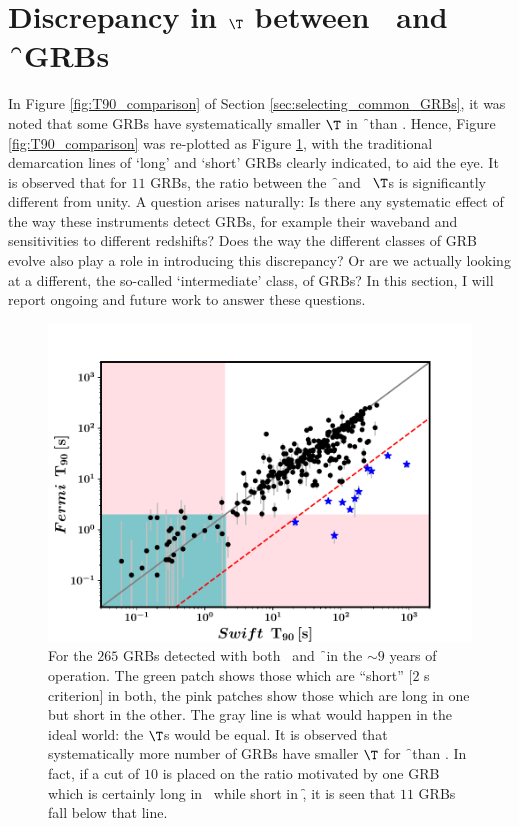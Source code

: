 \section*{\texorpdfstring{Discrepancy in $\T$ between \s\ and \f\ GRBs}{}}
In Figure \ref{fig:T90_comparison} of Section \ref{sec:selecting_common_GRBs}, it was noted that some GRBs have systematically smaller $\T$ in \f\ than \s. Hence, Figure \ref{fig:T90_comparison} was re-plotted as Figure \ref{fig:T90_vs_T90}, with the traditional demarcation lines of `long' and `short' GRBs clearly indicated, to aid the eye. It is observed that for $11$ GRBs, the ratio between the \f\ and \s\ $\T$s is significantly different from unity. A question arises naturally: Is there any systematic effect of the way these instruments detect GRBs, for example their waveband and sensitivities to different redshifts? Does the way the different classes of GRB evolve also play a role in introducing this discrepancy? Or are we actually looking at a different, the so-called `intermediate' class, of GRBs? In this section, I will report ongoing and future work to answer these questions.

\begin{figure}
\begin{center}
\includegraphics[scale=0.5]{T90_vs_T90--all}
\caption[Detailed comparison of $\T$s of \f\ and \s\ GRBs]{For the $265$ GRBs detected with both \s\ and \f\ in the $\sim 9$ years of operation. The green patch shows those which are ``short'' [$2$ s criterion] in both, the pink patches show those which are long in one but short in the other. The gray line is what would happen in the ideal world: the $\T$s would be equal. It is observed that systematically more number of GRBs have smaller $\T$ for \f\ than \s. In fact, if a cut of $10$ is placed on the ratio motivated by one GRB which is certainly long in \s\ while short in \f, it is seen that $11$ GRBs fall below that line.}
\label{fig:T90_vs_T90}
\end{center}
\end{figure}

